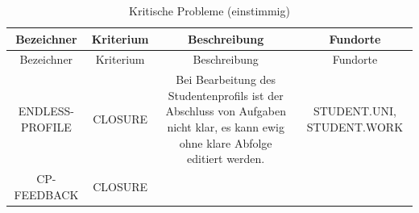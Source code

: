\documentclass[
  12pt,
  ngerman,
  a4paper,
]{article}
\begin{document}
\begin{longtable}[]{@{}cccc@{}}
\caption{Kritische Probleme (einstimmig)
\label{tbl:critical-problems}}\tabularnewline
\toprule
\begin{minipage}[b]{0.11\columnwidth}\centering
Bezeichner\strut
\end{minipage} & \begin{minipage}[b]{0.13\columnwidth}\centering
Kriterium\strut
\end{minipage} & \begin{minipage}[b]{0.33\columnwidth}\centering
Beschreibung\strut
\end{minipage} & \begin{minipage}[b]{0.32\columnwidth}\centering
Fundorte\strut
\end{minipage}\tabularnewline
\midrule
\endfirsthead
\toprule
\begin{minipage}[b]{0.11\columnwidth}\centering
Bezeichner\strut
\end{minipage} & \begin{minipage}[b]{0.13\columnwidth}\centering
Kriterium\strut
\end{minipage} & \begin{minipage}[b]{0.33\columnwidth}\centering
Beschreibung\strut
\end{minipage} & \begin{minipage}[b]{0.32\columnwidth}\centering
Fundorte\strut
\end{minipage}\tabularnewline
\midrule
\endhead
\begin{minipage}[t]{0.11\columnwidth}\centering
ENDLESS-PROFILE\strut
\end{minipage} & \begin{minipage}[t]{0.13\columnwidth}\centering
CLOSURE\strut
\end{minipage} & \begin{minipage}[t]{0.33\columnwidth}\centering
Bei Bearbeitung des Studentenprofils ist der Abschluss von Aufgaben
nicht klar, es kann ewig ohne klare Abfolge editiert werden.\strut
\end{minipage} & \begin{minipage}[t]{0.32\columnwidth}\centering
STUDENT.UNI, STUDENT.WORK\strut
\end{minipage}\tabularnewline
\begin{minipage}[t]{0.11\columnwidth}\centering
CP-FEEDBACK\strut
\end{minipage} & \begin{minipage}[t]{0.13\columnwidth}\centering
CLOSURE\strut
\end{minipage} & \begin{minipage}[t]{0.33\columnwidth}\centering

\end{minipage}
\end{longtable}
\end{document}
